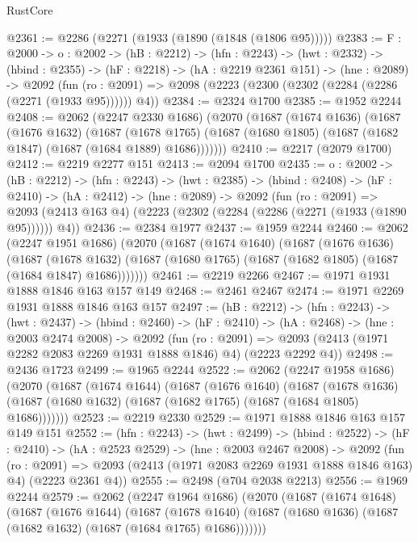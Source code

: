 \begin{lexlean}{RustCore}
\begin{coremodule}
@2361 := @2286 (@2271 (@1933 (@1890 (@1848 (@1806 @95)))))
@2383 := {F : @2000} ->
  {o : @2002} ->
  (hB : @2212) ->
  (hfn : @2243) ->
  (hwt : @2332) ->
  (hbind : @2355) ->
  (hF : @2218) ->
  (hA : @2219 @2361 @151) ->
  (hne : @2089) ->
  @2092 (fun (ro : @2091) => @2098 (@2223 (@2300 (@2302 (@2284 (@2286 (@2271 (@1933 @95)))))) @4))
@2384 := @2324 @1700
@2385 := @1952 @2244
@2408 := @2062
    (@2247 @2330 @1686)
    (@2070
      (@1687
        (@1674 @1636)
        (@1687
          (@1676 @1632)
          (@1687
            (@1678 @1765)
            (@1687 (@1680 @1805) (@1687 (@1682 @1847) (@1687 (@1684 @1889) @1686)))))))
@2410 := @2217 (@2079 @1700)
@2412 := @2219 @2277 @151
@2413 := @2094 @1700
@2435 := {o : @2002} ->
  (hB : @2212) ->
  (hfn : @2243) ->
  (hwt : @2385) ->
  (hbind : @2408) ->
  (hF : @2410) ->
  (hA : @2412) ->
  (hne : @2089) ->
  @2092
    (fun (ro : @2091) =>
    @2093 (@2413 @163 @4) (@2223 (@2302 (@2284 (@2286 (@2271 (@1933 (@1890 @95)))))) @4))
@2436 := @2384 @1977
@2437 := @1959 @2244
@2460 := @2062
    (@2247 @1951 @1686)
    (@2070
      (@1687
        (@1674 @1640)
        (@1687
          (@1676 @1636)
          (@1687
            (@1678 @1632)
            (@1687 (@1680 @1765) (@1687 (@1682 @1805) (@1687 (@1684 @1847) @1686)))))))
@2461 := @2219 @2266
@2467 := @1971 @1931 @1888 @1846 @163 @157 @149
@2468 := @2461 @2467
@2474 := @1971 @2269 @1931 @1888 @1846 @163 @157
@2497 := (hB : @2212) ->
  (hfn : @2243) ->
  (hwt : @2437) ->
  (hbind : @2460) ->
  (hF : @2410) ->
  (hA : @2468) ->
  (hne : @2003 @2474 @2008) ->
  @2092
    (fun (ro : @2091) =>
    @2093 (@2413 (@1971 @2282 @2083 @2269 @1931 @1888 @1846) @4) (@2223 @2292 @4))
@2498 := @2436 @1723
@2499 := @1965 @2244
@2522 := @2062
    (@2247 @1958 @1686)
    (@2070
      (@1687
        (@1674 @1644)
        (@1687
          (@1676 @1640)
          (@1687
            (@1678 @1636)
            (@1687 (@1680 @1632) (@1687 (@1682 @1765) (@1687 (@1684 @1805) @1686)))))))
@2523 := @2219 @2330
@2529 := @1971 @1888 @1846 @163 @157 @149 @151
@2552 := (hfn : @2243) ->
  (hwt : @2499) ->
  (hbind : @2522) ->
  (hF : @2410) ->
  (hA : @2523 @2529) ->
  (hne : @2003 @2467 @2008) ->
  @2092
    (fun (ro : @2091) =>
    @2093 (@2413 (@1971 @2083 @2269 @1931 @1888 @1846 @163) @4) (@2223 @2361 @4))
@2555 := @2498 (@704 @2038 @2213)
@2556 := @1969 @2244
@2579 := @2062
    (@2247 @1964 @1686)
    (@2070
      (@1687
        (@1674 @1648)
        (@1687
          (@1676 @1644)
          (@1687
            (@1678 @1640)
            (@1687 (@1680 @1636) (@1687 (@1682 @1632) (@1687 (@1684 @1765) @1686)))))))

\end{coremodule}
\end{lexlean}
